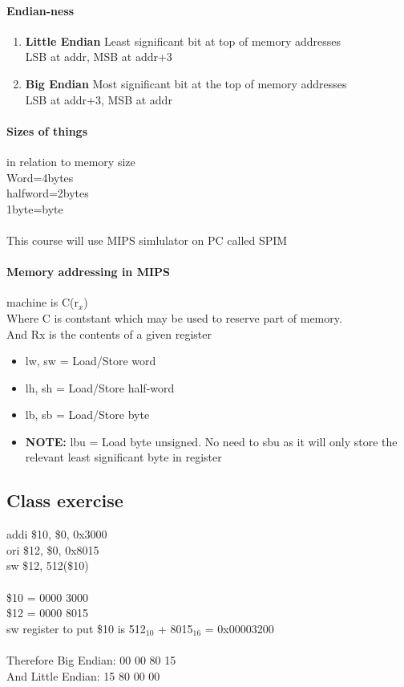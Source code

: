 \documentclass{article}
\newcommand\tab[1][0.5cm]{\hspace*{#1}}
\begin{document}
		\paragraph{Endian-ness}
		\begin{enumerate}
			\item \textbf{Little Endian} Least significant bit at top of memory addresses \\
			LSB at addr, MSB at addr+3
			\item \textbf{Big Endian} Most significant bit at the top of memory addresses \\
			LSB at addr+3, MSB at addr
		\end{enumerate}

		\paragraph{Sizes of things} in relation to memory size \\ \tab Word=4bytes \\ 
		\tab halfword=2bytes \\ 
		\tab 1byte=byte\\ \\
		This course will use MIPS simlulator on PC called SPIM

		\paragraph{Memory addressing in MIPS} machine is C(r$_x$)
			\\ \tab Where C is contstant which may be used to reserve part of memory. 
			\\ \tab And Rx is the contents of a given register

		\begin{itemize}
			\item lw, sw = Load/Store word
			\item lh, sh = Load/Store half-word
			\item lb, sb = Load/Store byte
			\item \textbf{NOTE: } 	lbu = Load byte unsigned. No need to sbu as it will only store the relevant least significant byte in register
		\end{itemize}


	\subsection*{Class exercise}
		addi \$10, \$0, 0x3000 \\
		ori \$12, \$0, 0x8015 \\
		sw \$12, 512(\$10) \\ \\
		\$10 = 0000 3000 \\
		\$12 = 0000 8015 \\
		sw register to put \$10 is 512$_{10}$ + 8015$_{16}$ = 0x00003200 \\\\
		Therefore Big Endian: \tab 00 00 80 15 \\
		And Little Endian: \tab \tab 15 80 00 00
\end{document}
